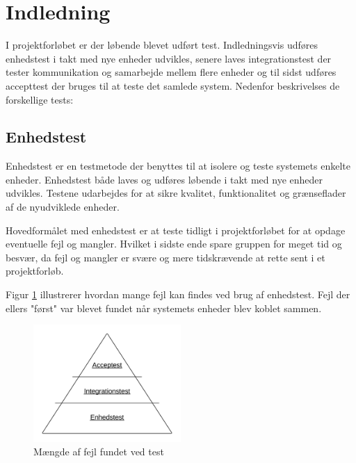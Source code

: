\section{Indledning}

I projektforløbet er der løbende blevet udført test. Indledningsvis udføres enhedstest i takt med nye enheder udvikles, senere laves integrationstest der tester kommunikation og samarbejde mellem flere enheder og til sidst udføres accepttest der bruges til at teste det samlede system. Nedenfor beskrivelses de forskellige tests:


\subsection{Enhedstest} 
\vspace{-0.5cm}
Enhedstest er en testmetode der benyttes til at isolere og teste systemets enkelte enheder. Enhedstest både laves og udføres løbende i takt med nye enheder udvikles. Testene udarbejdes for at sikre kvalitet, funktionalitet og grænseflader af de nyudviklede enheder. 

Hovedformålet med enhedstest er at teste tidligt i projektforløbet for at opdage eventuelle fejl og mangler. Hvilket i sidste ende spare gruppen for meget tid og besvær, da fejl og mangler er svære og mere tidskrævende at rette sent i et projektforløb.

Figur \ref{fig:test_forlob} illustrerer hvordan mange fejl kan findes ved brug af enhedstest. Fejl der ellers "først" var blevet fundet når systemets enheder blev koblet sammen.
\vspace{-0.4cm}
\begin{figure}[H]
	\centering
	\includegraphics[width=0.5\textwidth]{Billeder/Test/forlob.png}
	\vspace{-0.4cm}
	\caption{Mængde af fejl fundet ved test}
	\label{fig:test_forlob}
\end{figure}

\vspace{0.5cm}

